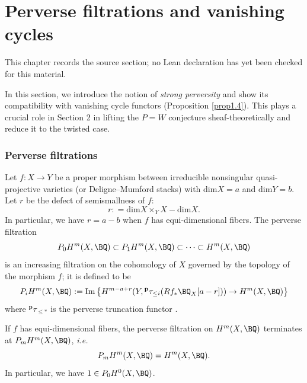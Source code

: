 \chapter{Perverse filtrations and vanishing cycles}
\label{pw-conjecture-gl-n-chapter-02}

\begin{remark}
\label{pw-conjecture-gl-n-chapter-02-source}
This chapter records the source section; no Lean declaration has yet been checked for this material.
\notready
\end{remark}

In this section, we introduce the notion of \emph{strong perversity} and show its compatibility with vanishing cycle functors (Proposition \ref{prop1.4}). This plays a crucial role in Section 2 in lifting the $P=W$ conjecture sheaf-theoretically and reduce it to the twisted case.

\subsection{Perverse filtrations}\label{sec1.1}
Let $f: X \to Y$ be a proper morphism between irreducible nonsingular quasi-projective varieties (or Deligne--Mumford stacks) with $\mathrm{dim}X = a$ and $\mathrm{dim}Y = b$. Let $r$ be the defect of semismallness of $f$:
\[
r: = \mathrm{dim} X \times_YX - \mathrm{dim}X.
\]
In particular, we have $r = a-b$ when $f$ has equi-dimensional fibers. The perverse filtration
\[
P_0H^m(X, \BQ) \subset P_1H^m(X, \BQ) \subset \dots \subset H^m(X, \BQ)
\]
is an increasing filtration on the cohomology of $X$ governed by the topology of the morphism $f$; it is defined to be
\[
P_iH^m(X, \BQ) := \mathrm{Im}\left\{ H^{m-a+r}(Y, {^\mathbf{p}\tau_{\leq i}} (Rf_* \BQ_X[a-r])) \to H^m(X, \BQ)\right\}
\]
where $^\mathbf{p}\tau_{\leq * }$ is the perverse truncation functor \cite{BBD}.

\begin{lem}
\notready\label{lem0}
If $f$ has equi-dimensional fibers, the perverse filtration on $H^m(X,\BQ)$ terminates at $P_mH^m(X, \BQ)$, \emph{i.e.}
\[
P_mH^m(X, \BQ) = H^m(X, \BQ).
\]
In particular, we have $1 \in P_0H^0(X, \BQ)$.
\end{lem}

